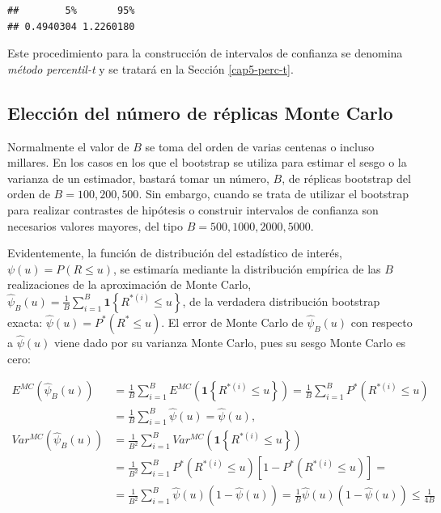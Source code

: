 \documentclass[]{book}
\theoremstyle{definition}
\theoremstyle{definition}
\theoremstyle{definition}
\theoremstyle{remark}
\begin{document}
\begin{verbatim}
##        5%       95% 
## 0.4940304 1.2260180
\end{verbatim}

Este procedimiento para la construcción de intervalos de confianza se
denomina \emph{método percentil-t} y se tratará en la Sección
\ref{cap5-perc-t}.

\subsection{Elección del número de réplicas Monte
Carlo}\label{eleccion-del-numero-de-replicas-monte-carlo}

Normalmente el valor de \(B\) se toma del orden de varias centenas o
incluso millares. En los casos en los que el bootstrap se utiliza para
estimar el sesgo o la varianza de un estimador, bastará tomar un número,
\(B\), de réplicas bootstrap del orden de \(B = 100, 200, 500\). Sin
embargo, cuando se trata de utilizar el bootstrap para realizar
contrastes de hipótesis o construir intervalos de confianza son
necesarios valores mayores, del tipo \(B = 500, 1000, 2000, 5000\).

Evidentemente, la función de distribución del estadístico de interés,
\(\psi \left( u \right) =P\left( R\leq u \right)\), se estimaría
mediante la distribución empírica de las \(B\) realizaciones de la
aproximación de Monte Carlo,
\(\hat{\psi}_{B}\left( u \right) = \frac{1}{B}\sum_{i=1}^{B}\mathbf{1}\left\{ R^{\ast (i)}\leq u\right\}\),
de la verdadera distribución bootstrap exacta:
\(\hat{\psi}\left( u \right) =P^{\ast}\left( R^{\ast}\leq u \right)\).
El error de Monte Carlo de \(\hat{\psi}_{B}\left( u \right)\) con
respecto a \(\hat{\psi}\left( u \right)\) viene dado por su varianza
Monte Carlo, pues su sesgo Monte Carlo es cero:

\[\begin{aligned}
E^{MC}\left( \hat{\psi}_{B}\left( u \right) \right) &= \frac{1}{B}
\sum_{i=1}^{B}E^{MC}\left( \mathbf{1}\left\{ R^{\ast (i)}\leq
u\right\} \right) =\frac{1}{B}\sum_{i=1}^{B}P^{\ast}\left( R^{\ast \left(
i \right)}\leq u \right) \\
&= \frac{1}{B}\sum_{i=1}^{B}\hat{\psi}\left( u \right) =\hat{\psi}\left(
u \right), \\
Var^{MC}\left( \hat{\psi}_{B}\left( u \right) \right) &= \frac{1}{B^2}
\sum_{i=1}^{B}Var^{MC}\left( \mathbf{1}\left\{ R^{\ast (i)}\leq
u\right\} \right) \\
&= \frac{1}{B^2}\sum_{i=1}^{B}P^{\ast}\left( R^{\ast (i)
}\leq u \right) \left[ 1-P^{\ast}\left( R^{\ast (i)}\leq
u \right) \right] = \\
&= \frac{1}{B^2}\sum_{i=1}^{B}\hat{\psi}\left( u \right) \left( 1-\hat{\psi}
\left( u \right) \right) =\frac{1}{B}\hat{\psi}\left( u \right) \left( 1-\hat{
\psi}\left( u \right) \right) \leq \frac{1}{4B}
\end{aligned}\]
\end{document}
